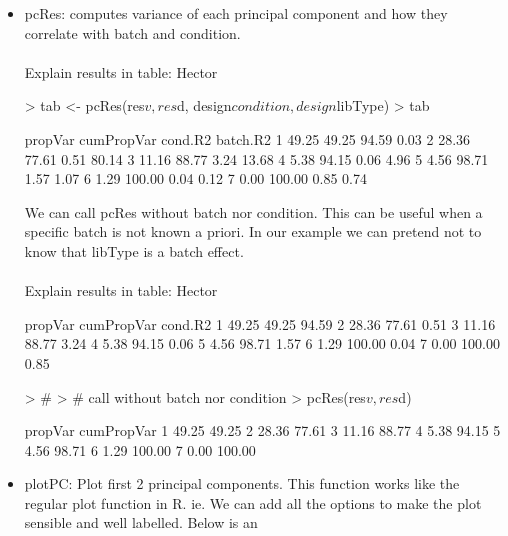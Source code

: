 \documentclass{article}
\begin{document}
\begin{itemize}
\item pcRes: computes variance of each principal component and how they correlate with batch and condition.\\\\
Explain results in table: Hector
\begin{Schunk}
\begin{Sinput}
> tab <- pcRes(res$v,res$d, design$condition, design$libType)
> tab
\end{Sinput}
\begin{Soutput}
  propVar cumPropVar cond.R2 batch.R2
1   49.25      49.25   94.59     0.03
2   28.36      77.61    0.51    80.14
3   11.16      88.77    3.24    13.68
4    5.38      94.15    0.06     4.96
5    4.56      98.71    1.57     1.07
6    1.29     100.00    0.04     0.12
7    0.00     100.00    0.85     0.74
\end{Soutput}
\end{Schunk}
We can call pcRes without batch nor condition. This can be useful when a specific batch
is not known a priori. In our example we can pretend not to know that libType is a batch effect.\\\\
Explain results in table: Hector
\begin{Schunk}
\begin{Soutput}
  propVar cumPropVar cond.R2
1   49.25      49.25   94.59
2   28.36      77.61    0.51
3   11.16      88.77    3.24
4    5.38      94.15    0.06
5    4.56      98.71    1.57
6    1.29     100.00    0.04
7    0.00     100.00    0.85
\end{Soutput}
\begin{Sinput}
> #
> # call without batch nor condition
> pcRes(res$v,res$d)
\end{Sinput}
\begin{Soutput}
  propVar cumPropVar
1   49.25      49.25
2   28.36      77.61
3   11.16      88.77
4    5.38      94.15
5    4.56      98.71
6    1.29     100.00
7    0.00     100.00
\end{Soutput}
\end{Schunk}
\newpage
\item plotPC: Plot first 2 principal components. This function works like the regular plot function 
in R. ie. We can add all the options to make the plot sensible and well labelled. Below is an 

\end{itemize}
\end{document}
